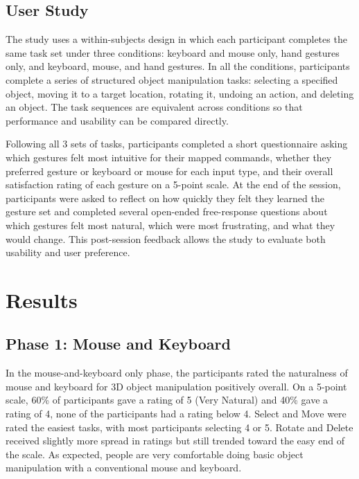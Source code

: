 \documentclass[manuscript]{acmart}
\begin{document}
\subsection{User Study}

The study uses a within-subjects design in which each participant completes the same task set under three conditions: keyboard and mouse only, hand gestures only, and keyboard, mouse, and hand gestures. In all the conditions, participants complete a series of structured object manipulation tasks: selecting a specified object, moving it to a target location, rotating it, undoing an action, and deleting an object. The task sequences are equivalent across conditions so that performance and usability can be compared directly. 

Following all 3 sets of tasks, participants completed a short questionnaire asking which gestures felt most intuitive for their mapped commands, whether they preferred gesture or keyboard or mouse for each input type, and their overall satisfaction rating of each gesture on a 5-point scale. At the end of the session, participants were asked to reflect on how quickly they felt they learned the gesture set and completed several open-ended free-response questions about which gestures felt most natural, which were most frustrating, and what they would change. This post-session feedback allows the study to evaluate both usability and user preference.

\section{Results}

\subsection{Phase 1: Mouse and Keyboard}

In the mouse-and-keyboard only phase, the participants rated the naturalness of mouse and keyboard for 3D object manipulation positively overall. On a 5-point scale, 60\% of participants gave a rating of 5 (Very Natural) and 40\% gave a rating of 4, none of the participants had a rating below 4. Select and Move were rated the easiest tasks, with most participants selecting 4 or 5. Rotate and Delete received slightly more spread in ratings but still trended toward the easy end of the scale. As expected, people are very comfortable doing basic object manipulation with a conventional mouse and keyboard.
\end{document}
